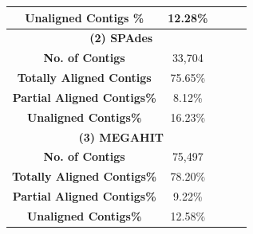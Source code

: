\begin{table}[h]
\begin{tabular}{|c|c|c|c|c|}
\hline
\textbf{Unaligned Contigs \%}&12.28\%&  &   \\   
\hline
\multicolumn{4}{|c|}{ \textbf{(2) SPAdes} }   \\ [0.5ex] %
\hline
\textbf{No. of Contigs} &33,704&&    \\   
\hline
\textbf{Totally Aligned Contigs} &75.65\%&  &   \\   
\hline
\textbf{Partial Aligned Contigs\%}&8.12\%&  &   \\   
\hline
\textbf{Unaligned Contigs\%}&16.23\%&  &   \\   
\hline
\multicolumn{4}{|c|}{ \textbf{(3) MEGAHIT} }    \\ [0.5ex] %
\hline
\textbf{No. of Contigs}&75,497&&    \\   
\hline
\textbf{Totally Aligned Contigs\%} &78.20\%&  &   \\   
\hline
\textbf{Partial Aligned Contigs\%}&9.22\%&  &   \\   
\hline
\textbf{Unaligned Contigs\%}&12.58\% &  &   \\   
\hline
\end{tabular}
\label{table:contigs-analysis}
\end{table}


